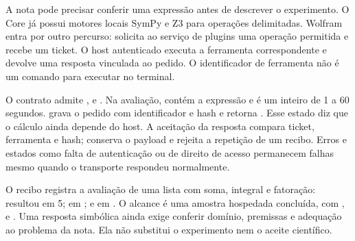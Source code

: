 \begin{descricao}
A nota pode precisar conferir uma expressão antes de descrever o experimento.
O Core já possui motores locais SymPy e Z3 para operações delimitadas. Wolfram
entra por outro percurso:  solicita ao serviço
de plugins uma operação permitida e recebe um ticket. O host autenticado
executa a ferramenta correspondente e devolve uma resposta vinculada ao pedido.
O identificador de ferramenta não é um comando para executar no terminal.
\end{descricao}

\begin{metodo}
O contrato admite ,  e . Na avaliação,
 contém a expressão e  é um inteiro de 1 a
60 segundos.  grava o pedido com
identificador e hash e retorna . Esse estado diz que o
cálculo ainda depende do host. A aceitação da resposta compara ticket,
ferramenta e hash; conserva o payload e rejeita a repetição de um recibo.
Erros e estados como falta de autenticação ou de direito de acesso permanecem
falhas mesmo quando o transporte respondeu normalmente.
\end{metodo}


\begin{resultado}
O recibo  registra a avaliação
de uma lista com soma, integral e fatoração:  resultou em 5;
 em ; e 
em . O alcance é uma amostra hospedada concluída,
com ,
 e .
Uma resposta simbólica ainda exige conferir domínio, premissas e adequação ao
problema da nota. Ela não substitui o experimento nem o aceite científico.
\end{resultado}

